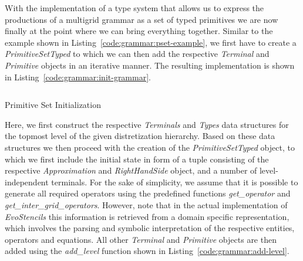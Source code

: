 With the implementation of a type system that allows us to express the productions of a multigrid grammar as a set of typed primitives we are now finally at the point where we can bring everything together.
Similar to the example shown in Listing~\ref{code:grammar:pset-example}, we first have to create a \emph{PrimitiveSetTyped} to which we can then add the respective \emph{Terminal} and \emph{Primitive} objects in an iterative manner.
The resulting implementation is shown in Listing~\ref{code:grammar:init-grammar}.
\begin{listing}
	\inputminted[linenos]{python}{evostencils/grammar/init_grammar.py}
	\caption{Primitive Set Initialization}
	\label{code:grammar:init-grammar}
\end{listing}
Here, we first construct the respective \emph{Terminals} and \emph{Types} data structures for the topmost level of the given distretization hierarchy.
Based on these data structures we then proceed with the creation of the \emph{PrimitiveSetTyped} object, to which we first include the initial state in form of a tuple consisting of the respective \emph{Approximation} and \emph{RightHandSide} object, and a number of level-independent terminals.
For the sake of simplicity, we assume that it is possible to generate all required operators using the predefined functions \emph{get\_operator} and \emph{get\_inter\_grid\_operators}.
However, note that in the actual implementation of \emph{EvoStencils} this information is retrieved from a domain specific representation, which involves the parsing and symbolic interpretation of the respective entities, operators and equations.  
All other \emph{Terminal} and \emph{Primitive} objects are then added using the \emph{add\_level} function shown in Listing~\ref{code:grammar:add-level}.

